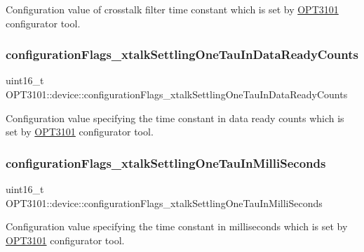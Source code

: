 Configuration value of crosstalk filter time constant which is set by \mbox{\hyperlink{namespace_o_p_t3101}{O\+P\+T3101}} configurator tool. 

\mbox{\label{class_o_p_t3101_1_1device_acc3387f448c10f642260a031c5d0a11d}} 
\subsubsection{\texorpdfstring{configuration\+Flags\+\_\+xtalk\+Settling\+One\+Tau\+In\+Data\+Ready\+Counts}{configurationFlags\_xtalkSettlingOneTauInDataReadyCounts}}
{\footnotesize\ttfamily uint16\+\_\+t O\+P\+T3101\+::device\+::configuration\+Flags\+\_\+xtalk\+Settling\+One\+Tau\+In\+Data\+Ready\+Counts}



Configuration value specifying the time constant in data ready counts which is set by \mbox{\hyperlink{namespace_o_p_t3101}{O\+P\+T3101}} configurator tool. 

\mbox{\label{class_o_p_t3101_1_1device_a9c579bc94d5a43a464129f5b67314eac}} 
\subsubsection{\texorpdfstring{configuration\+Flags\+\_\+xtalk\+Settling\+One\+Tau\+In\+Milli\+Seconds}{configurationFlags\_xtalkSettlingOneTauInMilliSeconds}}
{\footnotesize\ttfamily uint16\+\_\+t O\+P\+T3101\+::device\+::configuration\+Flags\+\_\+xtalk\+Settling\+One\+Tau\+In\+Milli\+Seconds}



Configuration value specifying the time constant in milliseconds which is set by \mbox{\hyperlink{namespace_o_p_t3101}{O\+P\+T3101}} configurator tool. 

